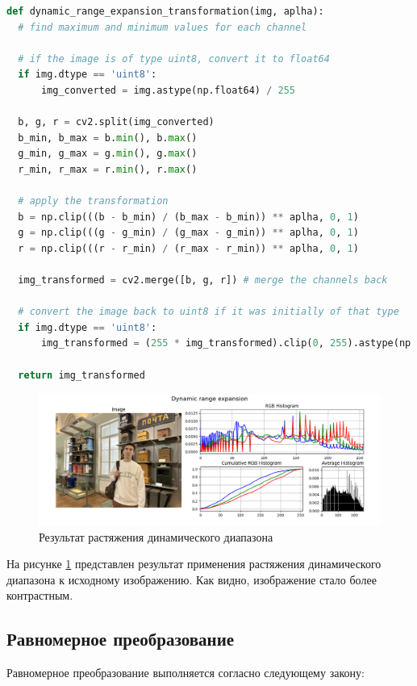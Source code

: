 \documentclass[a4paper, 12pt]{extarticle}
\begin{document}
\begin{lstlisting}[language=Python]
def dynamic_range_expansion_transformation(img, aplha):
  # find maximum and minimum values for each channel

  # if the image is of type uint8, convert it to float64
  if img.dtype == 'uint8':
      img_converted = img.astype(np.float64) / 255

  b, g, r = cv2.split(img_converted)
  b_min, b_max = b.min(), b.max()
  g_min, g_max = g.min(), g.max()
  r_min, r_max = r.min(), r.max()

  # apply the transformation
  b = np.clip(((b - b_min) / (b_max - b_min)) ** aplha, 0, 1)
  g = np.clip(((g - g_min) / (g_max - g_min)) ** aplha, 0, 1)
  r = np.clip(((r - r_min) / (r_max - r_min)) ** aplha, 0, 1)

  img_transformed = cv2.merge([b, g, r]) # merge the channels back

  # convert the image back to uint8 if it was initially of that type
  if img.dtype == 'uint8':
      img_transformed = (255 * img_transformed).clip(0, 255).astype(np.uint8)

  return img_transformed
\end{lstlisting}

\begin{figure}[h]
    \centering
    \includegraphics[width=\textwidth]{../results/Dynamic range expansion.png}
    \caption{Результат растяжения динамического диапазона}
    \label{fig:dynamic}
\end{figure}

На рисунке \ref{fig:dynamic} представлен результат применения растяжения динамического диапазона к исходному изображению. Как видно, изображение стало более контрастным. 

\subsection{Равномерное преобразование}

Равномерное преобразование выполняется согласно следующему закону:
\end{document}
